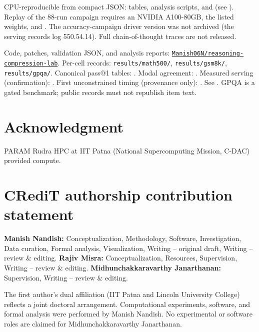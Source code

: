 \documentclass[11pt,a4paper]{article}
\begin{document}
CPU-reproducible from compact JSON: tables, analysis scripts, and  (see ). Replay of the 88-run campaign requires an NVIDIA A100-80GB, the listed weights, and . The accuracy-campaign driver version was not archived (the serving records log 550.54.14). Full chain-of-thought traces are not released.

Code, patches, validation JSON, and analysis reports:
\href{https://github.com/Manish06N/reasoning-compression-lab}{\nolinkurl{Manish06N/reasoning-compression-lab}}.
Per-cell records: \texttt{results/math500/}, \texttt{results/gsm8k/}, \texttt{results/gpqa/}.
Canonical pass@1 tables: .
Modal agreement: .
Measured serving (confirmation): .
First unconstrained timing (provenance only): . See . GPQA is a gated benchmark; public records must not republish item text.

\section*{Acknowledgment}
PARAM Rudra HPC at IIT Patna (National Supercomputing Mission, C-DAC) provided compute.

\section*{CRediT authorship contribution statement}
\textbf{Manish Nandish:} Conceptualization, Methodology, Software, Investigation, Data curation, Formal analysis, Visualization, Writing -- original draft, Writing -- review \& editing.
\textbf{Rajiv Misra:} Conceptualization, Resources, Supervision, Writing -- review \& editing.
\textbf{Midhunchakkaravarthy Janarthanan:} Supervision, Writing -- review \& editing.

The first author's dual affiliation (IIT Patna and Lincoln University College) reflects a joint doctoral arrangement. Computational experiments, software, and formal analysis were performed by Manish Nandish. No experimental or software roles are claimed for Midhunchakkaravarthy Janarthanan.

\appendix
\end{document}

